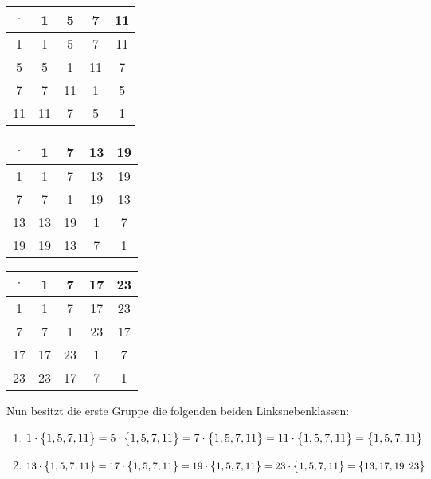 \documentclass{scrreprt}
\begin{document}
\begin{minipage}{.3\textwidth}
  \begin{tabular}{|c|cccc|}
    \hline
    $\cdot$ & 1  & 5  & 7  & 11 \\
    \hline
    1       & 1  & 5  & 7  & 11 \\
    5       & 5  & 1  & 11 & 7 \\
    7       & 7  & 11 & 1  & 5 \\
    11      & 11 & 7  & 5  & 1 \\
    \hline
  \end{tabular}
\end{minipage}
\begin{minipage}{.3\textwidth}
  \begin{tabular}{|c|cccc|}
    \hline
    $\cdot$ & 1  & 7  & 13 & 19 \\
    \hline
    1       & 1  & 7  & 13 & 19 \\
    7       & 7  & 1  & 19 & 13 \\
    13      & 13 & 19 & 1  & 7 \\
    19      & 19 & 13 & 7  & 1 \\
    \hline
  \end{tabular}
\end{minipage}
\begin{minipage}{.3\textwidth}
  \begin{tabular}{|c|cccc|}
    \hline
    $\cdot$ & 1  & 7  & 17 & 23 \\
    \hline
    1       & 1  & 7  & 17 & 23 \\
    7       & 7  & 1  & 23 & 17 \\
    17      & 17 & 23 & 1  & 7 \\
    23      & 23 & 17 & 7  & 1 \\
    \hline
  \end{tabular}
\end{minipage}

Nun besitzt die erste Gruppe die folgenden beiden Linksnebenklassen:
\begin{enumerate}[(1)]
\item $1 \cdot \qty\big{1, 5, 7, 11}
  = 5 \cdot \qty\big{1, 5, 7, 11}
  = 7 \cdot \qty\big{1, 5, 7, 11}
  = 11 \cdot \qty\big{1, 5, 7, 11}
  = \qty\big{1, 5, 7, 11}$

\item $13 \cdot \qty\big{1, 5, 7, 11} =
  17 \cdot \qty\big{1, 5, 7, 11} =
  19 \cdot \qty\big{1, 5, 7, 11} =
  23 \cdot \qty\big{1, 5, 7, 11} =
  \qty\big{13, 17, 19, 23}$
\end{enumerate}
\end{document}
